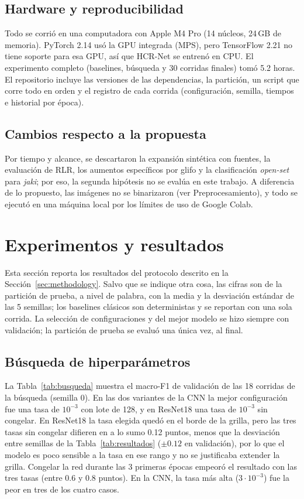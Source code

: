 \documentclass[conference]{IEEEtran}
\begin{document}
\subsection{Hardware y reproducibilidad}
Todo se corrió en una computadora con Apple M4 Pro (14 núcleos, 24\,GB de
memoria). PyTorch 2.14 usó la GPU integrada (MPS), pero TensorFlow 2.21 no
tiene soporte para esa GPU, así que HCR-Net se entrenó en CPU. El experimento
completo (baselines, búsqueda y 30 corridas finales) tomó 5.2 horas. El
repositorio incluye las versiones de las dependencias, la partición, un
script que corre todo en orden y el registro de cada corrida (configuración,
semilla, tiempos e historial por época).

\subsection{Cambios respecto a la propuesta}
Por tiempo y alcance, se descartaron la expansión sintética con fuentes, la
evaluación de RLR, los aumentos específicos por glifo y la clasificación
\textit{open-set} para \textit{jaki}; por eso, la segunda hipótesis no se
evalúa en este trabajo. A diferencia de lo propuesto, las imágenes no se
binarizaron (ver Preprocesamiento), y todo se ejecutó en una máquina local
por los límites de uso de Google Colab.


\section{Experimentos y resultados}
\label{sec:results}

Esta sección reporta los resultados del protocolo descrito en la
Sección~\ref{sec:methodology}. Salvo que se indique otra cosa, las cifras
son de la partición de prueba, a nivel de palabra, con la media y la
desviación estándar de las 5 semillas; los baselines clásicos son
deterministas y se reportan con una sola corrida. La selección de
configuraciones y del mejor modelo se hizo siempre con validación; la
partición de prueba se evaluó una única vez, al final.

\subsection{Búsqueda de hiperparámetros}
La Tabla~\ref{tab:busqueda} muestra el macro-F1 de validación de las 18
corridas de la búsqueda (semilla 0). En las dos variantes de la CNN la mejor
configuración fue una tasa de $10^{-3}$ con lote de 128, y en ResNet18 una
tasa de $10^{-3}$ sin congelar. En ResNet18 la tasa elegida quedó en el borde
de la grilla, pero las tres tasas sin congelar difieren en a lo sumo 0.12
puntos, menos que la desviación entre semillas de la Tabla~\ref{tab:resultados}
($\pm0.12$ en validación), por lo que el modelo es poco sensible a la tasa en
ese rango y no se justificaba extender la grilla. Congelar la red durante las
3 primeras épocas empeoró el resultado con las tres tasas (entre 0.6 y 0.8
puntos). En la CNN, la tasa más alta ($3\cdot10^{-3}$) fue la peor en tres de
los cuatro casos.
\end{document}
